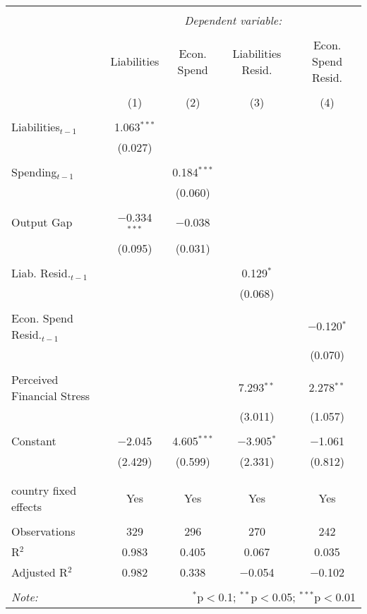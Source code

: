 
\begingroup 
\tiny 
\begin{tabular}{@{\extracolsep{5pt}}lcccc} 
\\[-1.8ex]\hline 
\hline \\[-1.8ex] 
 & \multicolumn{4}{c}{\textit{Dependent variable:}} \\ 
\cline{2-5} 
\\[-1.8ex] & Liabilities & Econ. Spend & Liabilities Resid. & Econ. Spend Resid. \\ 
\\[-1.8ex] & (1) & (2) & (3) & (4)\\ 
\hline \\[-1.8ex] 
 Liabilities$_{t-1}$ & 1.063$^{***}$ &  &  &  \\ 
  & (0.027) &  &  &  \\ 
  & & & & \\ 
 Spending$_{t-1}$ &  & 0.184$^{***}$ &  &  \\ 
  &  & (0.060) &  &  \\ 
  & & & & \\ 
 Output Gap & $-$0.334$^{***}$ & $-$0.038 &  &  \\ 
  & (0.095) & (0.031) &  &  \\ 
  & & & & \\ 
 Liab. Resid.$_{t-1}$ &  &  & 0.129$^{*}$ &  \\ 
  &  &  & (0.068) &  \\ 
  & & & & \\ 
 Econ. Spend Resid.$_{t-1}$ &  &  &  & $-$0.120$^{*}$ \\ 
  &  &  &  & (0.070) \\ 
  & & & & \\ 
 Perceived Financial Stress &  &  & 7.293$^{**}$ & 2.278$^{**}$ \\ 
  &  &  & (3.011) & (1.057) \\ 
  & & & & \\ 
 Constant & $-$2.045 & 4.605$^{***}$ & $-$3.905$^{*}$ & $-$1.061 \\ 
  & (2.429) & (0.599) & (2.331) & (0.812) \\ 
  & & & & \\ 
\hline \\[-1.8ex] 
country fixed effects & Yes & Yes & Yes & Yes \\ 
\hline \\[-1.8ex] 
Observations & 329 & 296 & 270 & 242 \\ 
R$^{2}$ & 0.983 & 0.405 & 0.067 & 0.035 \\ 
Adjusted R$^{2}$ & 0.982 & 0.338 & $-$0.054 & $-$0.102 \\ 
\hline 
\hline \\[-1.8ex] 
\textit{Note:}  & \multicolumn{4}{r}{$^{*}$p$<$0.1; $^{**}$p$<$0.05; $^{***}$p$<$0.01} \\ 
\end{tabular} 
\endgroup 
